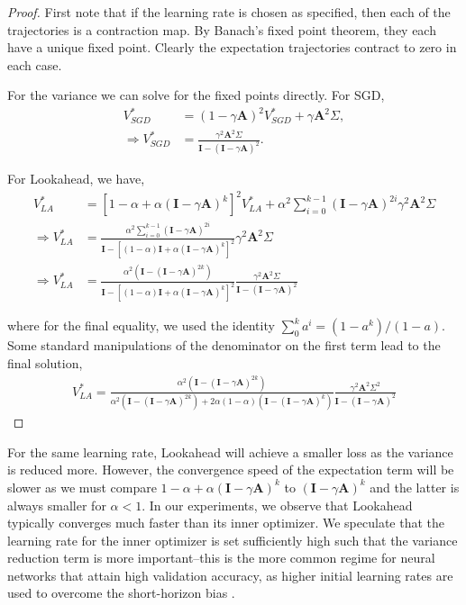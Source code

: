 \documentclass{article}
\newcommand{\bA}{\mathbf{A}}
\newcommand{\bI}{\mathbf{I}}
\begin{document}
\begin{proof}
First note that if the learning rate is chosen as specified, then each of the trajectories is a contraction map. By Banach's fixed point theorem, they each have a unique fixed point. Clearly the expectation trajectories contract to zero in each case.

For the variance we can solve for the fixed points directly. For SGD,
\begin{align*}
    V^*_{SGD} &= (1-\gamma \bA)^2 V^*_{SGD} + \gamma \bA^2 \Sigma, \\
    \Rightarrow V^*_{SGD} &= \frac{\gamma^2 \bA^2 \Sigma}{\bI - (\bI - \gamma \bA)^2}.
\end{align*}

For Lookahead, we have,
\begin{align*}
    V^*_{LA} &= [1-\alpha + \alpha (\bI - \gamma \bA)^k]^2 V^*_{LA} +\alpha^2 \sum_{i=0}^{k-1} (\bI - \gamma \bA)^{2i}\gamma^2\bA^2\Sigma \\
    \Rightarrow V^*_{LA} &= \frac{\alpha^2\sum_{i=0}^{k-1} (\bI - \gamma \bA)^{2i}}{\bI - [(1-\alpha)\bI + \alpha (\bI - \gamma \bA)^k]^2} \gamma^2 \bA^2\Sigma \\
\Rightarrow V^*_{LA} &= \frac{\alpha^2 (\bI - (\bI - \gamma\bA)^{2k})}{\bI - [(1 - \alpha) \bI + \alpha(\bI - \gamma\bA)^k]^2} \frac{\gamma^2 \bA^2 \Sigma}{\bI - (\bI - \gamma \bA)^2}
\end{align*}

where for the final equality, we used the identity $\sum_0^k a^i = (1-a^k)/(1-a)$. Some standard manipulations of the denominator on the first term lead to the final solution,
\begin{align*}
    V_{LA}^* = \frac{\alpha^2 (\bI - (\bI - \gamma\bA)^{2k})}{\alpha^2 (\bI - (\bI - \gamma\bA)^{2k}) + 2\alpha(1 - \alpha)(\bI - (\bI - \gamma\bA)^k)} \frac{\gamma^2 \bA^2 \Sigma^2}{\bI - (\bI - \gamma \bA)^2}
\end{align*}
\end{proof}

For the same learning rate, Lookahead will achieve a smaller loss as the variance is reduced more. However, the convergence speed of the expectation term will be slower as we must compare $1-\alpha + \alpha(\bI-\gamma\bA)^k$ to $(\bI-\gamma\bA)^k$ and the latter is always smaller for $\alpha < 1$. In our experiments, we observe that Lookahead typically converges much faster than its inner optimizer. We speculate that the learning rate for the inner optimizer is set sufficiently high such that the variance reduction term is more important--this is the more common regime for neural networks that attain high validation accuracy, as higher initial learning rates are used to overcome the short-horizon bias \citep{wu2018understanding}.
\end{document}

